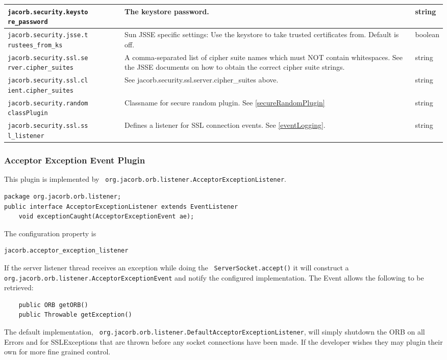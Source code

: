 {{\begin{small}
\begin{longtable}{|p{5cm}|p{9cm}|p{2cm}|}
\hline
\verb"jacorb.security.keysto"
\verb"re_password" & The keystore password. & string \\
\hline
\verb"jacorb.security.jsse.t"
\verb"rustees_from_ks" & Sun JSSE specific settings: Use the keystore to take trusted certificates from. Default is off. & boolean \\
\hline
\verb"jacorb.security.ssl.se"
\verb"rver.cipher_suites" & A comma-separated list of cipher suite names which must NOT contain whitespaces. See the JSSE documents on how to obtain the correct cipher suite strings. & string \\
\hline
\verb"jacorb.security.ssl.cl"
\verb"ient.cipher_suites" & See jacorb.security.ssl.server.cipher\_suites above. & string \\
\hline
\verb"jacorb.security.random"
\verb"classPlugin" & Classname for secure random plugin. See \ref{secureRandomPlugin} & string \\
\hline
\verb"jacorb.security.ssl.ss"
\verb"l_listener" & Defines a listener for SSL connection events. See \ref{eventLogging}.
& string \\
\hline
\end{longtable}
\end{small}

\subsubsection{Acceptor Exception Event Plugin}
\label{acceptorevent}
This plugin is implemented by {\tt
org.jacorb.orb.listener.AcceptorExceptionListener}.
\begin{small}
\begin{verbatim}
package org.jacorb.orb.listener;
public interface AcceptorExceptionListener extends EventListener
    void exceptionCaught(AcceptorExceptionEvent ae);
\end{verbatim}
\end{small}
The configuration property is
\begin{verbatim}
jacorb.acceptor_exception_listener
\end{verbatim}
If the server listener thread receives an exception while doing the {\tt
ServerSocket.accept()} it will construct a {\tt
org.jacorb.orb.listener.AcceptorExceptionEvent} and notify the configured
implementation. The Event allows the following to be retrieved:
\begin{small}
\begin{verbatim}
    public ORB getORB()
    public Throwable getException()
\end{verbatim}
\end{small}
The default implementation, {\tt
org.jacorb.orb.listener.DefaultAcceptor\-ExceptionListener}, will simply shutdown
the ORB on all Errors and for SSLExceptions that are thrown before any socket
connections have been made. If the developer wishes they may plugin
their own for more fine grained control.

}}
